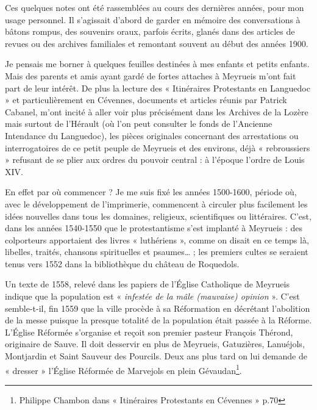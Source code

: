 

\vspace{0.7em}

Ces quelques notes ont été rassemblées au cours des dernières années, pour mon usage personnel. Il s’agissait d’abord de garder en mémoire des conversations à bâtons rompus, des souvenirs oraux, parfois écrits, glanés dans des articles de revues ou des archives familiales et remontant souvent au début des années 1900.

Je pensais me borner à quelques feuilles destinées à mes enfants et petits enfants. Mais des parents et amis ayant gardé de fortes attaches à Meyrueis m’ont fait part de leur intérêt. De plus la lecture des « Itinéraires Protestants en Languedoc » et particulièrement en Cévennes, documents et articles réunis par Patrick Cabanel, m’ont incité à aller voir plus précisément dans les Archives de la Lozère mais surtout de l’Hérault (où l’on peut consulter le fonds de l’Ancienne Intendance du Languedoc), les pièces originales concernant des arrestations ou interrogatoires de ce petit peuple de Meyrueis et des environs, déjà « rebroussiers » refusant de se plier aux ordres du pouvoir central : à l’époque l’ordre de Louis XIV.

En effet par où commencer ? Je me suis fixé les années 1500-1600, période où, avec le développement de l’imprimerie, commencent à circuler plus facilement les idées nouvelles dans tous les domaines, religieux, scientifiques ou littéraires. C’est, dans les années 1540-1550 que le protestantisme s’est implanté à Meyrueis : des colporteurs apportaient des livres « luthériens », comme on disait en ce temps là, libelles, traités, chansons spirituelles et psaumes… ; les premiers cultes se seraient tenus vers 1552 dans la bibliothèque du château de Roquedols.

Un texte de 1558, relevé dans les papiers de l’Église Catholique de Meyrueis indique que la population est « \textit{infestée de la mâle (mauvaise) opinion} ». C’est semble-t-il, fin 1559 que la ville procède à sa Réformation en décrétant l’abolition de la messe puisque la presque totalité de la population était passée à la Réforme. L’Église Réformée s’organise et reçoit son premier pasteur François Thérond, originaire de Sauve. Il doit desservir en plus de Meyrueis, Gatuzières, Lanuéjols, Montjardin et Saint Sauveur des Pourcils. Deux ans plus tard on lui demande de « dresser » l’Église Réformée de Marvejols en plein Gévaudan\footnote{Philippe Chambon dans « Itinéraires Protestants en Cévennes » p.70}.


